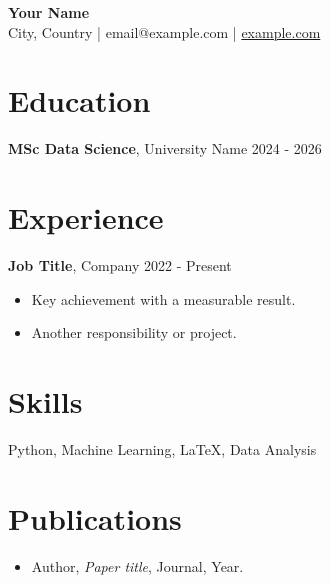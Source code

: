 \documentclass[11pt]{article}
\begin{document}
\begin{center}
  {\LARGE\bfseries Your Name}\\[4pt]
  City, Country \;|\; email@example.com \;|\; \href{https://example.com}{example.com}
\end{center}

\section{Education}
\textbf{MSc Data Science}, University Name \hfill 2024 - 2026

\section{Experience}
\textbf{Job Title}, Company \hfill 2022 - Present
\begin{itemize}
  \item Key achievement with a measurable result.
  \item Another responsibility or project.
\end{itemize}

\section{Skills}
Python, Machine Learning, \LaTeX, Data Analysis

\section{Publications}
\begin{itemize}
  \item Author, \emph{Paper title}, Journal, Year.
\end{itemize}
\end{document}
